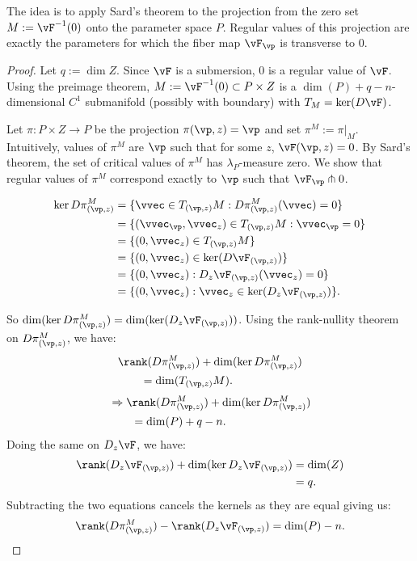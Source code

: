 The idea is to apply Sard's theorem to the projection from the zero set
$M:=\vF^{-1}(0)$ onto the parameter space $P$. Regular values of this projection
are exactly the parameters for which the fiber map $\vF_{\vp}$ is transverse to
$0$.

\begin{proof}\label{proof:parametric_submersion}
Let $q:=\dim Z$. Since $\vF$ is a submersion, $0$ is a regular value of $\vF$.
Using the preimage theorem, $M:=\vF^{-1}(0)\subset P\times Z$ is a
$\dim(P)+q-n$-dimensional $C^{1}$ submanifold (possibly with boundary) with
$T_M = \operatorname{ker}(D\vF)$.

Let $\pi:P\times Z\to P$ be the projection $\pi(\vp,z)=\vp$ and set
$\pi^{M}:=\pi|_{M}$. Intuitively, values of $\pi^{M}$ are $\vp$ such that for
some $z$, $\vF(\vp,z)=0$. By Sard's theorem, the set of critical values of
$\pi^{M}$ has $\lambda_{P}$-measure zero. We show that regular values of
$\pi^{M}$ correspond exactly to $\vp$ such that $\vF_{\vp}\pitchfork 0$.

\[
\begin{aligned}
\ker D \pi^{M}_{(\vp,z)}
&=\{\vvec\in T_{(\vp,z)}M:D \pi^{M}_{(\vp,z)}(\vvec)=0\}\\
&=\{(\vvec_{\vp},\vvec_{z})\in T_{(\vp,z)}M:\vvec_{\vp}=0\}\\
&=\{(0,\vvec_{z})\in T_{(\vp,z)}M\}\\
&=\{(0,\vvec_{z})\in\ker(D\vF_{(\vp,z)})\}\\
&=\{(0,\vvec_{z}):D_{z}\vF_{(\vp,z)}(\vvec_{z})=0\}\\
&=\{(0,\vvec_{z}):\vvec_{z}\in\ker(D_{z}\vF_{(\vp,z)})\}.
\end{aligned}
\]

So $\dim(\ker D \pi^{M}_{(\vp,z)}) = \dim(\ker(D_{z} \vF_{(\vp,z)}))$.
Using the rank-nullity theorem on $D \pi^{M}_{(\vp,z)}$, we have:
\[
\begin{aligned}
&\rank(D \pi^{M}_{(\vp,z)})
+\dim(\ker D \pi^{M}_{(\vp,z)})\\
&\qquad=\dim(T_{(\vp,z)}M).
\end{aligned}
\]
\[
\begin{aligned}
&\Rightarrow \rank(D \pi^{M}_{(\vp,z)})
+\dim(\ker D \pi^{M}_{(\vp,z)})\\
&\qquad=\dim(P)+q-n.
\end{aligned}
\]
Doing the same on $D_{z} \vF$, we have:
\[
\begin{aligned}
\rank(D_{z} \vF_{(\vp,z)})+\dim(\ker D_{z} \vF_{(\vp,z)})
&=\dim(Z)\\
&=q.
\end{aligned}
\]
Subtracting the two equations cancels the kernels as they are equal giving us:
\[
\rank(D \pi^{M}_{(\vp,z)})-\rank(D_{z} \vF_{(\vp,z)})
=\dim(P)-n.
\]


\end{proof}
